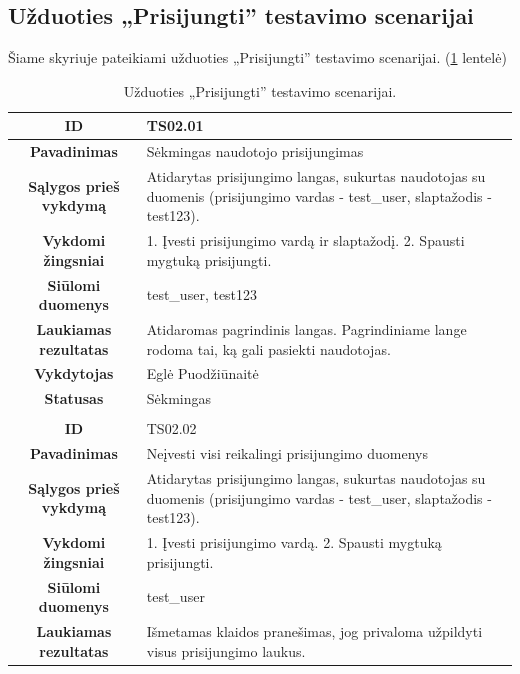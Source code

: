 \documentclass{VUMIFPSkursinis}
\begin{document}
	\subsection{Užduoties „Prisijungti” testavimo scenarijai}
	Šiame skyriuje pateikiami užduoties „Prisijungti” testavimo scenarijai. (\ref{prisijungimas} lentelė)
	\begin{table}[H]
		\caption{Užduoties „Prisijungti” testavimo scenarijai.}
		\begin{tabular}{|p{6cm}|p{11cm}|}
			\hline
			\multicolumn{1}{|c|}{{\bfseries ID}}&
			{TS02.01}\\
			\hline
			\multicolumn{1}{|c|}{{\bfseries Pavadinimas}}&
			{Sėkmingas naudotojo prisijungimas}\\
			\hline
			\multicolumn{1}{|c|}{{\bfseries Sąlygos prieš vykdymą}}&
			{Atidarytas prisijungimo langas, sukurtas naudotojas su duomenis (prisijungimo vardas - test\_user, slaptažodis - test123).}\\
			\hline
			\multicolumn{1}{|c|}{{\bfseries Vykdomi žingsniai}}&
			{1. Įvesti prisijungimo vardą ir slaptažodį.
			 2. Spausti mygtuką prisijungti.}\\
			\hline
			\multicolumn{1}{|c|}{{\bfseries Siūlomi duomenys}}&
			{test\_user, test123}\\
			\hline
			\multicolumn{1}{|c|}{{\bfseries Laukiamas rezultatas}}&
			{Atidaromas pagrindinis langas. Pagrindiniame lange rodoma tai, ką gali pasiekti naudotojas.}\\
			\hline
			\multicolumn{1}{|c|}{{\bfseries Vykdytojas}}&
			{Eglė Puodžiūnaitė}\\
			\hline
			\multicolumn{1}{|c|}{{\bfseries Statusas}}&
			{Sėkmingas}\\
			\hline
			\rowcolor{lightgray}
			\multicolumn{2}{|c|}{}\\
			\hline
			\multicolumn{1}{|c|}{{\bfseries ID}}&
			{TS02.02}\\
			\hline
			\multicolumn{1}{|c|}{{\bfseries Pavadinimas}}&
			{Neįvesti visi reikalingi prisijungimo duomenys}\\
			\hline
			\multicolumn{1}{|c|}{{\bfseries Sąlygos prieš vykdymą}}&
			{Atidarytas prisijungimo langas, sukurtas naudotojas su duomenis (prisijungimo vardas - test\_user, slaptažodis - test123).}\\
			\hline
			\multicolumn{1}{|c|}{{\bfseries Vykdomi žingsniai}}&
			{1. Įvesti prisijungimo vardą.
			 2. Spausti mygtuką prisijungti.}\\
		 	\hline
			\multicolumn{1}{|c|}{{\bfseries Siūlomi duomenys}}&
			{test\_user}\\
			\hline
			\multicolumn{1}{|c|}{{\bfseries Laukiamas rezultatas}}&
			{Išmetamas klaidos pranešimas, jog privaloma užpildyti visus prisijungimo laukus.}\\
			\hline
			\end{tabular}
		\label{prisijungimas}
	\end{table}	
\end{document}
